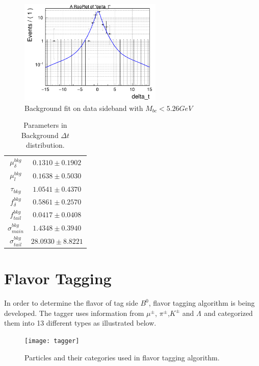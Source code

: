 \begin{figure}[H]
	\centering
	\includegraphics[height=5cm]{figures/bkg-cpfit-data-mbc526}
	\caption{Background fit on data sideband with $M_{bc} < 5.26 GeV$}
\end{figure}
\begin{table}[H]
	\centering
	\begin{tabular}{|c|c|}
		\hline
		$\mu^{bkg}_{\delta}$ & $0.1310 \pm 0.1902$\\
		$\mu^{bkg}_{l}$&  $0.1638 \pm 0.5030$ \\
		$\tau_{bkg}$ & $1.0541\pm 0.4370$\\
		$f_{\delta}^{bkg}$ &  $0.5861\pm 0.2570$\\
		$f^{bkg}_{tail}$  & $0.0417\pm 0.0408$ \\
		$\sigma^{bkg}_{main}$ & $1.4348\pm 0.3940$\\
		$\sigma^{bkg}_{tail}$ & $28.0930 \pm 8.8221$\\
		\hline
	\end{tabular}
	\caption{Parameters in Background $\Delta t$ distribution. }
\end{table}


\section{Flavor Tagging}
 In order to determine the flavor of tag side $B^0$, flavor tagging algorithm is being developed. The tagger uses information from $\mu^{\pm}$, $\pi^{\pm}$,$K^{\pm}$ and $\Lambda^{}$ and categorized them into 13 different types as illustrated below. 

\begin{figure}[H]
\centering
\texttt{[image: tagger]}
\caption{Particles and their categories used in flavor tagging algorithm.}
\end{figure}
 
